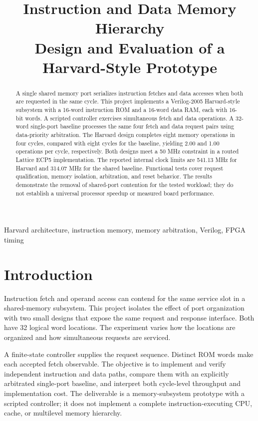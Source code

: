 \documentclass[conference]{IEEEtran}
\title{Instruction and Data Memory Hierarchy\\Design and Evaluation of a Harvard-Style Prototype}
\author{\IEEEauthorblockN{Anshuman Mehta, Rudraksh, Vridhi Chaudhary, Bineet Keshari, and Shrijan Sanidhya}
\IEEEauthorblockA{Master of Computer Applications\\Phase II Final Project Report}}
\begin{document}
\maketitle

\begin{abstract}
A single shared memory port serializes instruction fetches and data accesses when both are requested in the same cycle. This project implements a Verilog-2005 Harvard-style subsystem with a 16-word instruction ROM and a 16-word data RAM, each with 16-bit words. A scripted controller exercises simultaneous fetch and data operations. A 32-word single-port baseline processes the same four fetch and data request pairs using data-priority arbitration. The Harvard design completes eight memory operations in four cycles, compared with eight cycles for the baseline, yielding 2.00 and 1.00 operations per cycle, respectively. Both designs meet a 50 MHz constraint in a routed Lattice ECP5 implementation. The reported internal clock limits are 541.13 MHz for Harvard and 314.07 MHz for the shared baseline. Functional tests cover request qualification, memory isolation, arbitration, and reset behavior. The results demonstrate the removal of shared-port contention for the tested workload; they do not establish a universal processor speedup or measured board performance.
\end{abstract}

\begin{IEEEkeywords}
Harvard architecture, instruction memory, memory arbitration, Verilog, FPGA timing
\end{IEEEkeywords}

\section{Introduction}
Instruction fetch and operand access can contend for the same service slot in a shared-memory subsystem. This project isolates the effect of port organization with two small designs that expose the same request and response interface. Both have 32 logical word locations. The experiment varies how the locations are organized and how simultaneous requests are serviced.

A finite-state controller supplies the request sequence. Distinct ROM words make each accepted fetch observable. The objective is to implement and verify independent instruction and data paths, compare them with an explicitly arbitrated single-port baseline, and interpret both cycle-level throughput and implementation cost. The deliverable is a memory-subsystem prototype with a scripted controller; it does not implement a complete instruction-executing CPU, cache, or multilevel memory hierarchy.
\end{document}
